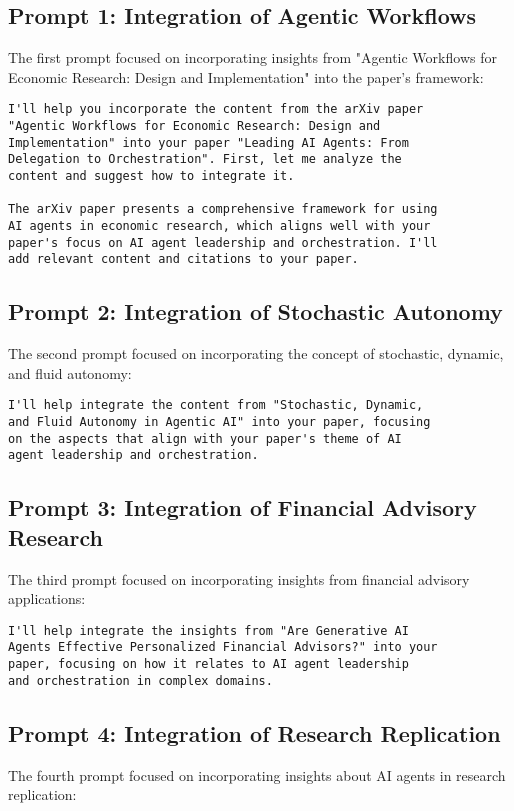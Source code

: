 \documentclass[conference]{IEEEtran}
\begin{document}
\subsection{Prompt 1: Integration of Agentic Workflows}
The first prompt focused on incorporating insights from "Agentic Workflows for Economic Research: Design and Implementation" into the paper's framework:

\begin{lstlisting}
I'll help you incorporate the content from the arXiv paper 
"Agentic Workflows for Economic Research: Design and 
Implementation" into your paper "Leading AI Agents: From 
Delegation to Orchestration". First, let me analyze the 
content and suggest how to integrate it.

The arXiv paper presents a comprehensive framework for using 
AI agents in economic research, which aligns well with your 
paper's focus on AI agent leadership and orchestration. I'll 
add relevant content and citations to your paper.
\end{lstlisting}

\subsection{Prompt 2: Integration of Stochastic Autonomy}
The second prompt focused on incorporating the concept of stochastic, dynamic, and fluid autonomy:

\begin{lstlisting}
I'll help integrate the content from "Stochastic, Dynamic, 
and Fluid Autonomy in Agentic AI" into your paper, focusing 
on the aspects that align with your paper's theme of AI 
agent leadership and orchestration.
\end{lstlisting}

\subsection{Prompt 3: Integration of Financial Advisory Research}
The third prompt focused on incorporating insights from financial advisory applications:

\begin{lstlisting}
I'll help integrate the insights from "Are Generative AI 
Agents Effective Personalized Financial Advisors?" into your 
paper, focusing on how it relates to AI agent leadership 
and orchestration in complex domains.
\end{lstlisting}

\subsection{Prompt 4: Integration of Research Replication}
The fourth prompt focused on incorporating insights about AI agents in research replication:
\end{document}
